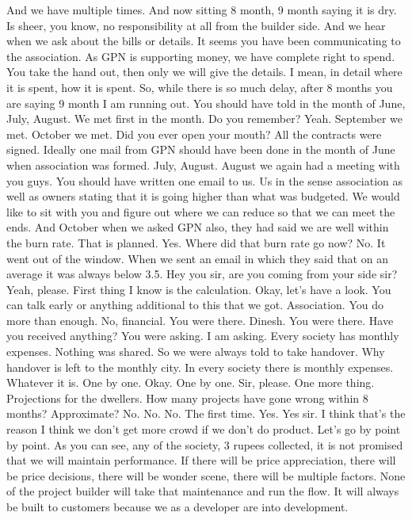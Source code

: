 And we have multiple times.
And now sitting 8 month, 9 month saying it is dry.
Is sheer, you know, no responsibility at all from the builder side.
And we hear when we ask about the bills or details.
It seems you have been communicating to the association.
As GPN is supporting money, we have complete right to spend.
You take the hand out, then only we will give the details.
I mean, in detail where it is spent, how it is spent.
So, while there is so much delay, after 8 months you are saying 9 month I am running out.
You should have told in the month of June, July, August.
We met first in the month. Do you remember?
Yeah.
September we met. October we met.
Did you ever open your mouth?
All the contracts were signed.
Ideally one mail from GPN should have been done in the month of June when association was formed.
July, August. August we again had a meeting with you guys.
You should have written one email to us.
Us in the sense association as well as owners stating that it is going higher than what was budgeted.
We would like to sit with you and figure out where we can reduce so that we can meet the ends.
And October when we asked GPN also, they had said we are well within the burn rate.
That is planned.
Yes.
Where did that burn rate go now?
No.
It went out of the window.
When we sent an email in which they said that on an average it was always below 3.5.
Hey you sir, are you coming from your side sir?
Yeah, please.
First thing I know is the calculation.
Okay, let's have a look.
You can talk early or anything additional to this that we got.
Association.
You do more than enough.
No, financial.
You were there.
Dinesh.
You were there.
Have you received anything?
You were asking.
I am asking.
Every society has monthly expenses.
Nothing was shared.
So we were always told to take handover.
Why handover is left to the monthly city.
In every society there is monthly expenses.
Whatever it is.
One by one.
Okay.
One by one.
Sir, please.
One more thing.
Projections for the dwellers.
How many projects have gone wrong within 8 months?
Approximate?
No.
No.
No.
The first time.
Yes.
Yes sir.
I think that's the reason I think we don't get more crowd if we don't do product.
Let's go by point by point.
As you can see, any of the society, 3 rupees collected, it is not promised that we will
maintain performance.
If there will be price appreciation, there will be price decisions, there will be wonder
scene, there will be multiple factors.
None of the project builder will take that maintenance and run the flow.
It will always be built to customers because we as a developer are into development.

